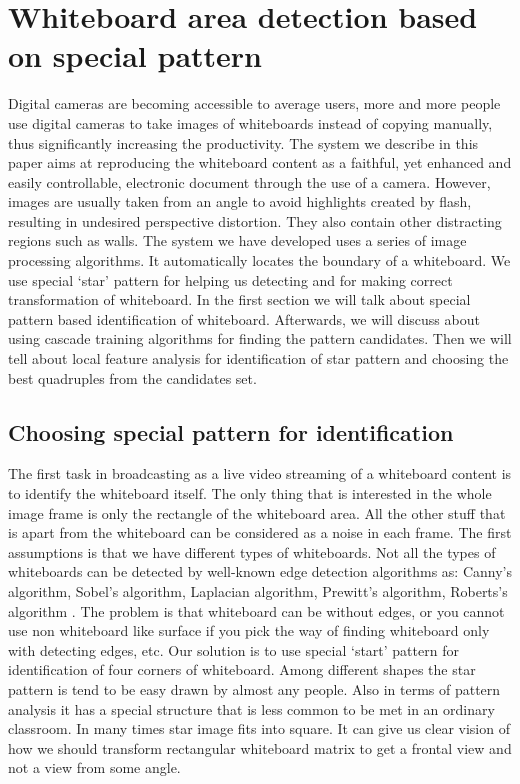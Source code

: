 \chapter{Whiteboard area detection based on special pattern}
Digital cameras are becoming accessible to average users, more and more people use digital cameras to take images of whiteboards instead of copying manually, thus significantly increasing the productivity. The system we describe in this paper aims at reproducing the whiteboard content as a faithful, yet enhanced and easily controllable, electronic document through the use of a camera. However, images are usually taken from an angle to avoid highlights created by flash, resulting in undesired perspective distortion. They also contain other distracting regions such as walls. The system we have developed uses a series of image processing algorithms. It automatically locates the boundary of a whiteboard. We use special ‘star’ pattern for helping us detecting and for making correct transformation of whiteboard. In the first section we will talk about special pattern based identification of whiteboard. Afterwards, we will discuss about using cascade training algorithms for finding the pattern candidates. Then we will tell about local feature analysis for identification of star pattern and choosing the best quadruples from the candidates set. 
\section{Choosing special pattern for identification}
The first task in broadcasting as a live video streaming of a whiteboard content is to identify the whiteboard itself. The only thing that is interested in the whole image frame is only the rectangle of the whiteboard area. All the other stuff that is apart from the whiteboard can be considered as a noise in each frame. The first assumptions is that we have different types of whiteboards. Not all the types of whiteboards can be detected by well-known edge detection algorithms as: Canny’s algorithm, Sobel’s algorithm, Laplacian algorithm, Prewitt’s algorithm, Roberts’s algorithm \cite{Argyle}. The problem is that whiteboard can be without edges, or you cannot use non whiteboard like surface if you pick the way of finding whiteboard only with detecting edges, etc. Our solution is to use special ‘start’ pattern for identification of four corners of whiteboard. Among different shapes the star pattern is tend to be easy drawn by almost any people. Also in terms of pattern analysis it has a special structure that is less common to be met in an ordinary classroom. In many times star image fits into square. It can give us clear vision of how we should transform rectangular whiteboard matrix to get a frontal view and not a view from some angle.

